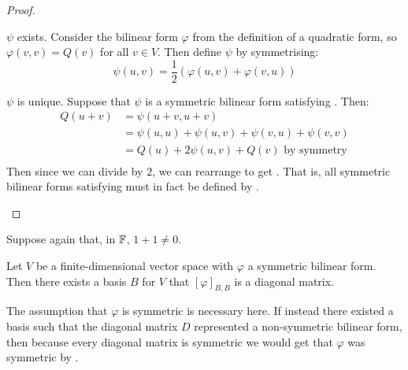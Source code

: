 \documentclass[../Main.tex]{subfiles}
\begin{document}
\begin{proof}
    \begin{subproof}{$\psi$ exists.}
        Consider the bilinear form $\varphi$ from the definition of a quadratic form, so $\varphi(v, v) = Q(v)$ for all $v \in V$. Then define $\psi$ by symmetrising:
        \begin{equation*}
            \psi(u, v) = \frac12 (\varphi(u, v) + \varphi(v, u))
        \end{equation*}
    \end{subproof}
    \begin{subproof}{$\psi$ is unique.}
        Suppose that $\psi$ is a symmetric bilinear form satisfying . Then:
        \begin{align*}
            Q(u + v) &= \psi(u + v, u + v) \\
            &= \psi(u, u) + \psi(u, v) + \psi(v, u) + \psi(v, v) \\
            &= Q(u) + 2\psi(u, v) + Q(v) \text{ by symmetry} \\
        \end{align*}
        Then since we can divide by $2$, we can rearrange to get . That is, all symmetric bilinear forms satisfying  must in fact be defined by .
    \end{subproof}
\end{proof}
\begin{theorem}
    Suppose again that, in $\mathbb{F}$, $1 + 1 \neq 0$.

    Let $V$ be a finite-dimensional vector space with $\varphi$ a symmetric bilinear form. Then there exists a basis $B$ for $V$ that $[\varphi]_{B, B}$ is a diagonal matrix.
    \label{thmBFSymImpliesDiag}
\end{theorem}
\begin{remark}
    The assumption that $\varphi$ is symmetric is necessary here. If instead there existed a basis such that the diagonal matrix $D$ represented a non-symmetric bilinear form, then because every diagonal matrix is symmetric we would get that $\varphi$ was symmetric by .
\end{remark}
\end{document}
